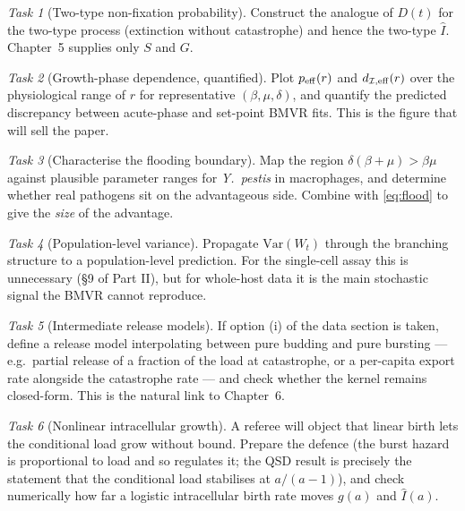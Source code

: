 \documentclass[11pt]{article}
\newcommand{\wt}{W_t}
\newcommand{\Ihat}{\widehat{I}}
\newcommand{\Icell}{\mathcal{I}}
\theoremstyle{plain}
\theoremstyle{definition}
\theoremstyle{remark}
\newtheorem{task}{Task}
\begin{document}
\begin{task}[Two-type non-fixation probability]
\label{task:twotypeD}
Construct the analogue of $D(t)$ for the two-type process (extinction without
catastrophe) and hence the two-type $\Ihat$. Chapter~5 supplies only $S$ and $G$.
\end{task}

\begin{task}[Growth-phase dependence, quantified]
Plot $p_{\rm eff}(r)$ and $d_{\Icell,{\rm eff}}(r)$ over the physiological range of $r$
for representative $(\beta,\mu,\delta)$, and quantify the predicted discrepancy between
acute-phase and set-point BMVR fits. This is the figure that will sell the paper.
\end{task}

\begin{task}[Characterise the flooding boundary]
Map the region $\delta(\beta+\mu)>\beta\mu$ against plausible parameter ranges for
\textit{Y.~pestis} in macrophages, and determine whether real pathogens sit on the
advantageous side. Combine with \eqref{eq:flood} to give the \emph{size} of the advantage.
\end{task}

\begin{task}[Population-level variance]
Propagate $\mathrm{Var}(\wt)$ through the branching structure to a population-level
prediction. For the single-cell assay this is unnecessary (\S9 of Part II), but for
whole-host data it is the main stochastic signal the BMVR cannot reproduce.
\end{task}

\begin{task}[Intermediate release models]
If option (i) of the data section is taken, define a release model interpolating between
pure budding and pure bursting --- e.g.\ partial release of a fraction of the load at
catastrophe, or a per-capita export rate alongside the catastrophe rate --- and check
whether the kernel remains closed-form. This is the natural link to Chapter~6.
\end{task}

\begin{task}[Nonlinear intracellular growth]
A referee will object that linear birth lets the conditional load grow without bound.
Prepare the defence (the burst hazard is proportional to load and so regulates it; the
QSD result is precisely the statement that the conditional load stabilises at
$a/(a-1)$), and check numerically how far a logistic intracellular birth rate moves
$g(a)$ and $\Ihat(a)$.
\end{task}
\end{document}
